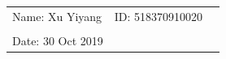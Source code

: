 \documentclass{article}
\begin{document}
\hrulefill
\thispagestyle{empty}



\begin{center}

\begin{large}


\end{large}



\hrulefill



\vspace*{5cm}

\begin{Large}


\end{Large}



\vspace{2em}



\begin{large}


\end{large}

\end{center}





\vfill



\begin{table}[h!]

\flushleft

\begin{tabular}{lll}

Name: Xu Yiyang \hspace*{2em}&

ID: 518370910020\hspace*{2em}\\





\\



Date: 30 Oct 2019 



\end{tabular}

\end{table}
\end{document}
